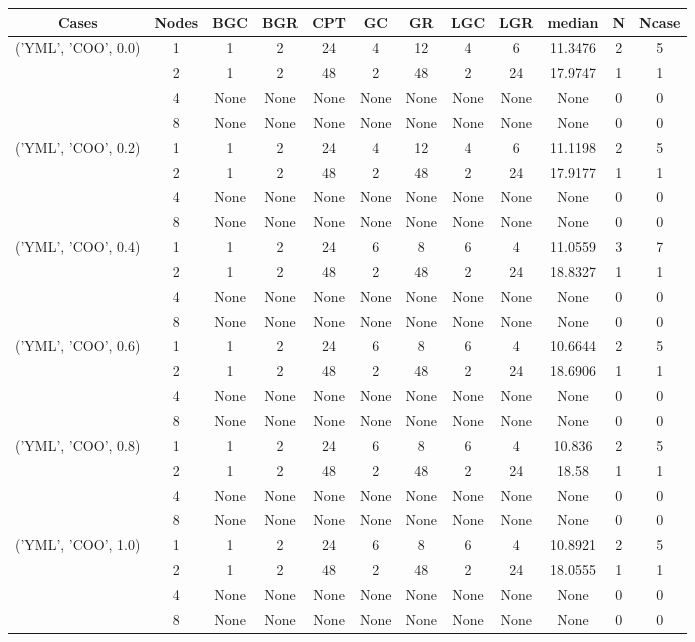 \begin{tabular}{cccccccccccc}
\hline
Cases & Nodes& BGC& BGR& CPT& GC& GR& LGC& LGR& median & N & Ncase \\
\hline
\multirow{4}{*}{('YML', 'COO', 0.0)}& 1& 1& 2& 24& 4& 12& 4& 6& 11.3476& 2& 5\\
& 2& 1& 2& 48& 2& 48& 2& 24& 17.9747& 1& 1\\
& 4& None& None& None& None& None& None& None& None& 0& 0\\
& 8& None& None& None& None& None& None& None& None& 0& 0\\
\hline
\multirow{4}{*}{('YML', 'COO', 0.2)}& 1& 1& 2& 24& 4& 12& 4& 6& 11.1198& 2& 5\\
& 2& 1& 2& 48& 2& 48& 2& 24& 17.9177& 1& 1\\
& 4& None& None& None& None& None& None& None& None& 0& 0\\
& 8& None& None& None& None& None& None& None& None& 0& 0\\
\hline
\multirow{4}{*}{('YML', 'COO', 0.4)}& 1& 1& 2& 24& 6& 8& 6& 4& 11.0559& 3& 7\\
& 2& 1& 2& 48& 2& 48& 2& 24& 18.8327& 1& 1\\
& 4& None& None& None& None& None& None& None& None& 0& 0\\
& 8& None& None& None& None& None& None& None& None& 0& 0\\
\hline
\multirow{4}{*}{('YML', 'COO', 0.6)}& 1& 1& 2& 24& 6& 8& 6& 4& 10.6644& 2& 5\\
& 2& 1& 2& 48& 2& 48& 2& 24& 18.6906& 1& 1\\
& 4& None& None& None& None& None& None& None& None& 0& 0\\
& 8& None& None& None& None& None& None& None& None& 0& 0\\
\hline
\multirow{4}{*}{('YML', 'COO', 0.8)}& 1& 1& 2& 24& 6& 8& 6& 4& 10.836& 2& 5\\
& 2& 1& 2& 48& 2& 48& 2& 24& 18.58& 1& 1\\
& 4& None& None& None& None& None& None& None& None& 0& 0\\
& 8& None& None& None& None& None& None& None& None& 0& 0\\
\hline
\multirow{4}{*}{('YML', 'COO', 1.0)}& 1& 1& 2& 24& 6& 8& 6& 4& 10.8921& 2& 5\\
& 2& 1& 2& 48& 2& 48& 2& 24& 18.0555& 1& 1\\
& 4& None& None& None& None& None& None& None& None& 0& 0\\
& 8& None& None& None& None& None& None& None& None& 0& 0\\
\hline
\end{tabular}
